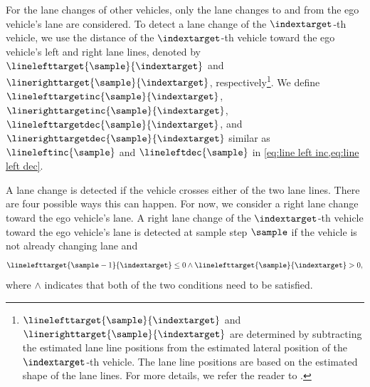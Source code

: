 \cstartc
For the lane changes of other vehicles, only the lane changes to and from the ego vehicle's lane are considered.
To detect a lane change of the $\indextarget$-th vehicle, we use the distance of the $\indextarget$-th vehicle toward the ego vehicle's left and right lane lines, denoted by $\linelefttarget{\sample}{\indextarget}$ and $\linerighttarget{\sample}{\indextarget}$, respectively\cendc\cstartd\footnote{\cstartd $\linelefttarget{\sample}{\indextarget}$ and $\linerighttarget{\sample}{\indextarget}$ are determined by subtracting the estimated lane line positions from the estimated lateral position of the $\indextarget$-th vehicle. The lane line positions are based on the estimated shape of the lane lines. For more details, we refer the reader to \autocite{elfring2016effective}.\cendd}\cendd\cstartc.
We define $\linelefttargetinc{\sample}{\indextarget}$, $\linerighttargetinc{\sample}{\indextarget}$, $\linelefttargetdec{\sample}{\indextarget}$, and $\linerighttargetdec{\sample}{\indextarget}$ similar as $\lineleftinc{\sample}$ and $\lineleftdec{\sample}$ in \cref{eq:line left inc,eq:line left dec}.

A lane change is detected if the vehicle crosses either of the two lane lines.
There are four possible ways this can happen.
For now, we consider a right lane change toward the ego vehicle's lane.
A right lane change of the $\indextarget$-th vehicle toward the ego vehicle's lane is detected at sample step $\sample$ if the vehicle is not already changing lane and
\begin{equation}
	\label{eq:detect lane change target}
	\linelefttarget{\sample-1}{\indextarget} \leq 0 \land \linelefttarget{\sample}{\indextarget} > 0,
\end{equation}
where $\land$ indicates that both of the two conditions need to be satisfied.

